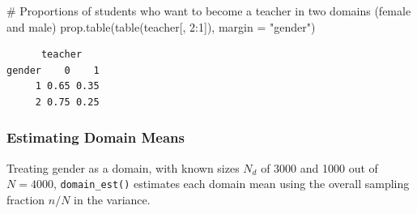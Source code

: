 \documentclass[
  letterpaper,
  DIV=11,
  numbers=noendperiod]{scrreprt}
\newenvironment{Shaded}{\begin{snugshade}}{\end{snugshade}}
\newcommand{\AttributeTok}[1]{\textcolor[rgb]{0.40,0.45,0.13}{#1}}
\newcommand{\CommentTok}[1]{\textcolor[rgb]{0.37,0.37,0.37}{#1}}
\newcommand{\DecValTok}[1]{\textcolor[rgb]{0.68,0.00,0.00}{#1}}
\newcommand{\FunctionTok}[1]{\textcolor[rgb]{0.28,0.35,0.67}{#1}}
\newcommand{\NormalTok}[1]{\textcolor[rgb]{0.00,0.23,0.31}{#1}}
\newcommand{\OtherTok}[1]{\textcolor[rgb]{0.00,0.23,0.31}{#1}}
\newcommand{\SpecialCharTok}[1]{\textcolor[rgb]{0.37,0.37,0.37}{#1}}
\newcommand{\StringTok}[1]{\textcolor[rgb]{0.13,0.47,0.30}{#1}}
\renewcommand{\[}{\begin{equation}}
\renewcommand{\]}{\end{equation}}
\begin{document}
\begin{Shaded}
\begin{Highlighting}[]
\CommentTok{\# Proportions of students who want to become a teacher in two domains (female and male)}
\FunctionTok{prop.table}\NormalTok{(}\FunctionTok{table}\NormalTok{(teacher[, }\DecValTok{2}\SpecialCharTok{:}\DecValTok{1}\NormalTok{]), }\AttributeTok{margin =} \StringTok{"gender"}\NormalTok{)}
\end{Highlighting}
\end{Shaded}

\begin{verbatim}
      teacher
gender    0    1
     1 0.65 0.35
     2 0.75 0.25
\end{verbatim}

\subsubsection{Estimating Domain Means}\label{estimating-domain-means-1}

Treating gender as a domain, with known sizes \(N_d\) of 3000 and 1000
out of \(N = 4000\), \texttt{domain\_est()} estimates each domain mean
using the overall sampling fraction \(n/N\) in the variance.

\begin{Shaded}
\end{Shaded}
\end{document}

